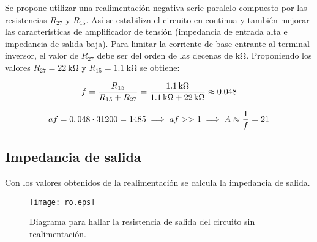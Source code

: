 
	Se propone utilizar una realimentación negativa serie paralelo compuesto por las resistencias $R_{27}$ y $R_{15}$. Así se estabiliza el circuito en continua y también mejorar las características de amplificador de tensión (impedancia de entrada alta e impedancia de salida baja). Para limitar la corriente de base entrante al terminal inversor, el valor de $R_{27}$ debe ser del orden de las decenas de \si{\kilo\ohm}. Proponiendo los valores $R_{27}=\SI{22}{\kilo\ohm}$ y $R_{15}=\SI{1.1}{\kilo\ohm}$ se obtiene:

\begin{equation}
	\centering
	f = \frac{R_{15}}{R_{15} + R_{27}} = \frac{\SI{1.1}{\kilo\ohm}}{\SI{1.1}{\kilo\ohm} + \SI{22}{\kilo\ohm}} \approx \num{0.048}
\end{equation}

\begin{equation}
	\centering
	af = 0,048 \cdot 31200 = 1485 \implies af >> 1 \implies A \approx \frac{1}{f} = 21
\end{equation}

\subsection{Impedancia de salida}
	Con los valores obtenidos de la realimentación se calcula la impedancia de salida.

\begin{figure}[H]
	 \centering
	 \texttt{[image: ro.eps]}
	 \caption{Diagrama para hallar la resistencia de salida del circuito sin realimentación.}
\end{figure}

